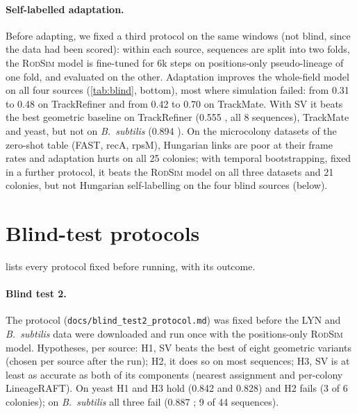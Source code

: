 \documentclass[10pt,twocolumn,letterpaper]{article}
\newcommand{\ours}{LineageRAFT\xspace}
\newcommand{\rodsim}{\textsc{RodSim}\xspace}
\begin{document}
\paragraph{Self-labelled adaptation.}
Before adapting, we fixed a third protocol on the same windows (not blind, since the data had been scored): within each source, sequences are split into two folds, the \rodsim model is fine-tuned for 6k steps on positions-only pseudo-lineage of one fold, and evaluated on the other.
Adaptation improves the whole-field model on all four sources (\cref{tab:blind}, bottom), most where simulation failed: from 0.31 to 0.48 on TrackRefiner and from 0.42 to 0.70 on TrackMate.
With SV it beats the best geometric baseline on TrackRefiner (0.555 , all 8 sequences), TrackMate and yeast, but not on \emph{B.~subtilis} (0.894 ).
On the microcolony datasets of the zero-shot table (FAST, recA, rpsM), Hungarian links are poor at their frame rates and adaptation hurts on all 25 colonies; with temporal bootstrapping, fixed in a further protocol, it beats the \rodsim model on all three datasets and 21 colonies, but not Hungarian self-labelling on the four blind sources (below).



\section{Blind-test protocols}
 lists every protocol fixed before running, with its outcome.

\paragraph{Blind test 2.}
The protocol (\texttt{docs/blind\_test2\_protocol.md}) was fixed before the LYN and \emph{B.~subtilis} data were downloaded and run once with the positions-only \rodsim model.
Hypotheses, per source: H1, SV beats the best of eight geometric variants (chosen per source after the run); H2, it does so on most sequences; H3, SV is at least as accurate as both of its components (nearest assignment and per-colony \ours).
On yeast H1 and H3 hold (0.842  and 0.828) and H2 fails (3 of 6 colonies); on \emph{B.~subtilis} all three fail (0.887 ; 9 of 44 sequences).
\end{document}
